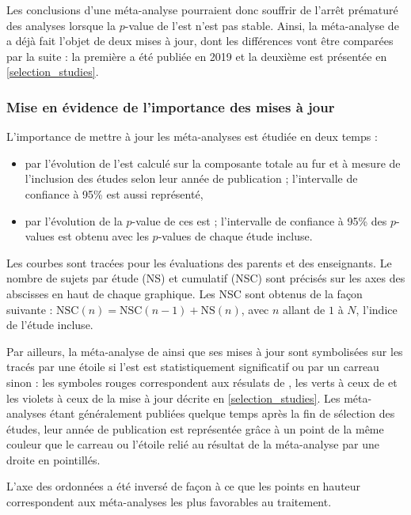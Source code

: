 Les conclusions d'une méta-analyse pourraient donc souffrir de l'arrêt prématuré des analyses lorsque la $p$-value de l'\gls{est} n'est pas stable. 
Ainsi, la méta-analyse de \citet{Cortese2016} a déjà fait l'objet de deux mises à jour, dont les différences vont être comparées par la suite : la première a été publiée 
en 2019 \citep{Bussalb2019clinical} et la deuxième est présentée en \ref{selection_studies}. 

\subsubsection{Mise en évidence de l'importance des mises à jour} \label{methods_importance_to_update_meta_analysis}

L'importance de mettre à jour les méta-analyses est étudiée en deux temps :
\begin{itemize}
\item par l'évolution de l'\gls{est} calculé sur la composante totale au fur et à mesure de l'inclusion des études selon leur année de publication ; l'intervalle de confiance à 95\% est 
aussi représenté,
\item par l'évolution de la $p$-value de ces \gls{est} ; l'intervalle de confiance à 95\% des $p$-values
est obtenu avec les $p$-values de chaque étude incluse.
\end{itemize}
Les courbes sont tracées pour les évaluations des parents et des enseignants. Le nombre de sujets par étude (NS) et cumulatif (NSC) sont précisés sur les axes 
des abscisses en haut de chaque graphique. Les NSC sont obtenus de la façon suivante : $\text{NSC}(n) = \text{NSC}(n - 1) + \text{NS}(n)$, avec $n$ 
allant de $1$ à $N$, l'indice de l'étude incluse.
 
Par ailleurs, la méta-analyse de \citet{Cortese2016} ainsi que ses mises
à jour sont symbolisées sur les tracés par une étoile si l'\gls{est} est statistiquement significatif ou par un carreau sinon : les symboles
rouges correspondent aux résulats de \citet{Cortese2016}, les verts à ceux de \citet{Bussalb2019clinical} et les violets à ceux de la mise à jour décrite en \ref{selection_studies}. Les méta-analyses
étant généralement publiées quelque temps après la fin de sélection des études, leur année de publication est représentée grâce à un point de la même couleur que le carreau ou
l'étoile relié au résultat de la méta-analyse par une droite en pointillés. 

L'axe des ordonnées a été inversé de façon à ce que les points en hauteur correspondent aux méta-analyses les plus favorables au traitement.


